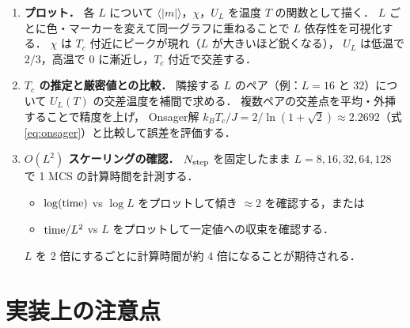 \documentclass[12pt,a4paper]{ltjsarticle}
\begin{document}
\begin{enumerate}
  \item \textbf{プロット．}
        各 $L$ について $\langle|m|\rangle$，$\chi$，$U_L$ を温度 $T$ の関数として描く．
        $L$ ごとに色・マーカーを変えて同一グラフに重ねることで $L$ 依存性を可視化する．
        $\chi$ は $T_c$ 付近にピークが現れ（$L$ が大きいほど鋭くなる），
        $U_L$ は低温で $2/3$，高温で $0$ に漸近し，$T_c$ 付近で交差する．

  \item \textbf{$T_c$ の推定と厳密値との比較．}
        隣接する $L$ のペア（例：$L=16$ と $32$）について $U_L(T)$ の交差温度を補間で求める．
        複数ペアの交差点を平均・外挿することで精度を上げ，
        Onsager解 $k_B T_c / J = 2/\ln(1+\sqrt{2}) \approx 2.2692$（式\eqref{eq:onsager}）と比較して誤差を評価する．

  \item \textbf{$O(L^2)$ スケーリングの確認．}
        $N_{\rm step}$ を固定したまま $L = 8, 16, 32, 64, 128$ で 1 MCS の計算時間を計測する．
        \begin{itemize}
          \item $\log({\rm time})$ vs $\log L$ をプロットして傾き $\approx 2$ を確認する，または
          \item ${\rm time}/L^2$ vs $L$ をプロットして一定値への収束を確認する．
        \end{itemize}
        $L$ を 2 倍にするごとに計算時間が約 4 倍になることが期待される．
\end{enumerate}

\section{実装上の注意点}
\end{document}
